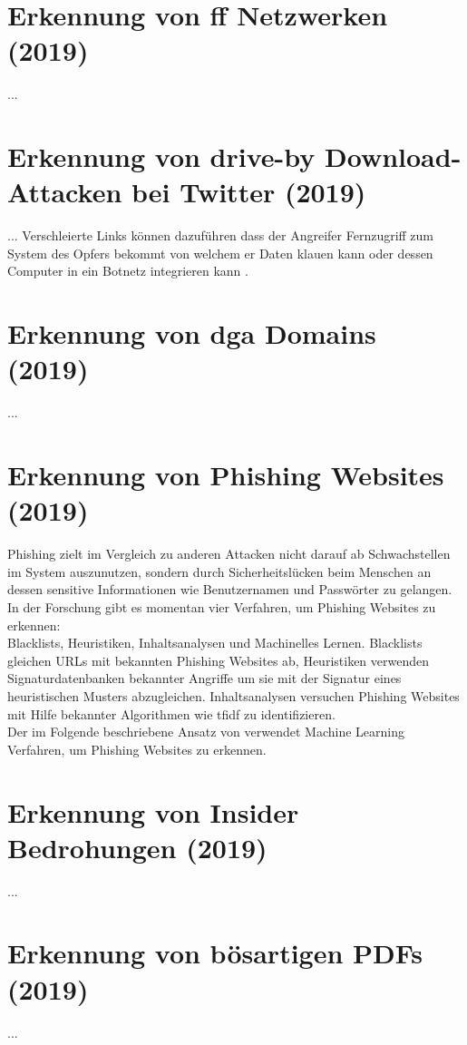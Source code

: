 \documentclass[
    12pt, %
    DIV10,
    ngerman, %
    a4paper, %
    oneside, %
    titlepage, %
    parskip=half, %
    headings=normal, %
    listof=totoc, %
    bibliography=totoc, %
    index=totoc, %
    captions=tableheading, %
    final %
]{scrreprt}
\begin{document}
\section{Erkennung von \ac{ff} Netzwerken (2019)}
\textcite{Chen2019}...
%
\section{Erkennung von drive-by Download-Attacken bei Twitter (2019)}
\textcite{Javed2019}...
Verschleierte Links können dazuführen dass der Angreifer Fernzugriff zum System des Opfers bekommt von welchem er Daten klauen kann oder dessen Computer in ein Botnetz integrieren kann \parencite{provos2007ghost}.
%
\section{Erkennung von \ac{dga} Domains (2019)}
\textcite{Li2019}...
%
\section{Erkennung von Phishing Websites (2019)}
Phishing zielt im Vergleich zu anderen Attacken nicht darauf ab Schwachstellen im System auszunutzen, sondern durch Sicherheitslücken beim Menschen an dessen sensitive Informationen wie Benutzernamen und Passwörter zu gelangen.
In der Forschung gibt es momentan vier Verfahren, um Phishing Websites zu erkennen:\\
Blacklists, Heuristiken, Inhaltsanalysen und Machinelles Lernen. Blacklists gleichen URLs mit bekannten Phishing Websites ab, Heuristiken verwenden Signaturdatenbanken bekannter Angriffe um sie mit der Signatur eines heuristischen Musters abzugleichen. Inhaltsanalysen versuchen Phishing Websites mit Hilfe bekannter Algorithmen wie \ac{tfidf} zu identifizieren. \\
Der im Folgende beschriebene Ansatz von \textcite{Alswailem2019} verwendet Machine Learning Verfahren, um Phishing Websites zu erkennen.
%
\section{Erkennung von Insider Bedrohungen (2019)}
\textcite{Le2019}...
%
\section{Erkennung von bösartigen PDFs (2019)}
\textcite{Jeong2019}...
%
\end{document}
